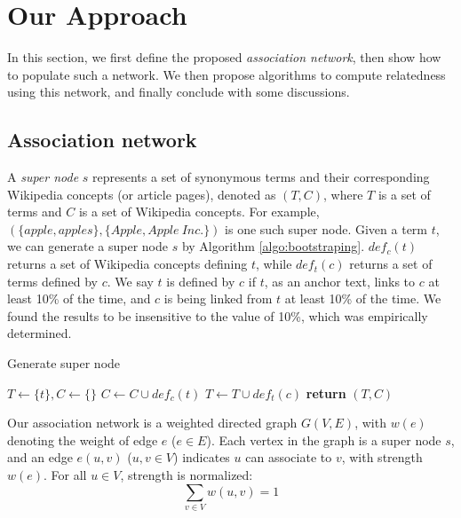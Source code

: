 \documentclass[letterpaper]{article}
\begin{document}
\section{Our Approach}
\label{sec:approach}

In this section, we first define the proposed {\em association
network}, then show how to populate such a network. We then
propose algorithms to compute relatedness using this network,
and finally conclude with some discussions. 

\subsection{Association network}
\label{sec:definition}

A {\em super node} $s$ represents a set of synonymous terms
and their corresponding Wikipedia concepts (or article pages), 
denoted as $(T, C)$, where $T$
is a set of terms and $C$ is a set of Wikipedia concepts. For
example, $(\{apple, apples\}, \{Apple, Apple\ Inc.\})$ is one such
super node. Given a term $t$, we can generate a super node $s$ by
Algorithm \ref{algo:bootstraping}.
$def_c(t)$ returns a set of Wikipedia concepts defining $t$, 
while $def_t(c)$ returns a set of terms defined by $c$. 
We say $t$ is defined by $c$ if
$t$, as an anchor text, links to $c$ at least 10\% of the time, and
$c$ is being linked from $t$ at least 10\% of the time. 
We found the results to be insensitive to the value of 10\%, 
which was empirically determined.

\begin{algorithm}[th]
\caption{Generate super node}
\label{algo:bootstraping}
\begin{algorithmic}[1]

\State $T \leftarrow \{t\}, C \leftarrow \{\}$
\State $C \leftarrow C \cup def_c(t)$
\EndFor
{}
\State $T \leftarrow T \cup def_t(c)$
\EndFor
\EndWhile
\State \textbf{return} $(T, C)$

\EndFunction
\end{algorithmic}
\end{algorithm}

Our association network is a weighted directed graph $G (V, E)$,
with $w(e)$ denoting the weight of edge $e$ ($e\in E$). Each vertex
in the graph is a super node $s$, and an edge $e(u, v)$ 
($u, v\in V$) indicates $u$ can associate to $v$, with strength $w(e)$.
For all $u\in V$, strength is normalized:
\begin{equation}
\sum_{v\in V} w(u, v) = 1
\label{eq:normalize}
\end{equation}
\end{document}
